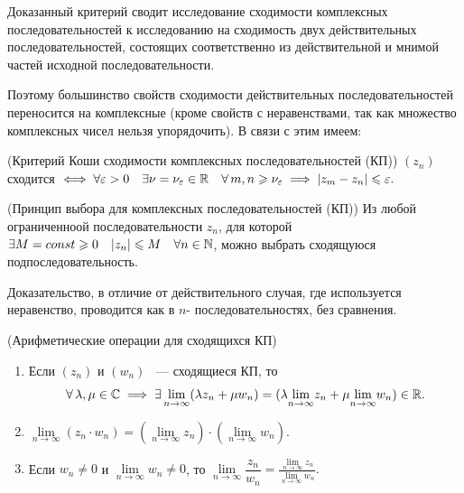 \documentclass[../../main.tex]{subfiles}
\begin{document}
\begin{rem}
	Доказанный критерий сводит исследование сходимости комплексных
	 последовательностей к исследованию на сходимость двух действительных
	 последовательностей, состоящих соответственно из действительной и мнимой
	 частей исходной последовательности.
	
	Поэтому большинство свойств сходимости действительных последовательностей 
	 переносится на комплексные (кроме свойств с неравенствами, так как множество
	 комплексных чисел нельзя упорядочить). В связи с этим имеем:
\end{rem}
	\begin{thm}(Критерий Коши сходимости комплексных последовательностей (КП))
		$ (z_n) $ сходится $ \iff \forall \varepsilon > 0\quad \exists \nu = \nu_\varepsilon 
		\in \mathbb{R} \quad \forall\, m, n \geqslant \nu_\varepsilon \implies |z_m - z_n| \leqslant \varepsilon.$
	\end{thm} 

	\begin{thm}(Принцип выбора для комплексных последовательностей (КП))		
		Из любой ограниченноой последовательности $ z_n $, для которой $ \exists M = 
		const \geqslant 0 \quad |z_n| \leqslant M\quad \forall n \in \mathbb{N} $, можно выбрать 
		сходящуюся 
		подпоследовательность.
	\end{thm}
	
		Доказательство, в отличие от действительного случая, где используется 
		неравенство, проводится как в $n$- последовательностях, без 
		сравнения.

	\begin{thm}(Арифметические операции для сходящихся КП)
		\begin{enumerate}
			\item Если $ (z_n) $ и $ (w_n) $ ~--- сходящиеся КП, то \[ \forall\, 
			\lambda, \mu \in \mathbb{C} \implies
			\exists\, \underset{n \to \infty}{\lim} (\lambda z_n + \mu w_n) = 
			(\lambda \underset{n \to \infty}{\lim}z_n + \mu \underset{n \to 
			\infty}{\lim}w_n) \in \mathbb{R}. \]
			
			\item $ \underset{n \to \infty}{\lim} (z_n \cdot w_n) = \left(\underset{n 
			\to 
			\infty}{\lim} z_n\right)\cdot\left(\underset{n \to \infty}{\lim} 
			w_n\right).$
			
			\item Если $ w_n \neq 0 $ и $ \underset{n \to \infty}{\lim} w_n 
			\neq 0 $, то $ \underset{n \to \infty}{\lim} \dfrac{z_n}{w_n} = 
			\frac{\underset{n \to \infty}{\lim} z_n}{\underset{n \to \infty}{\lim} w_n}.
			$
		\end{enumerate}
	\end{thm}
\end{document}
